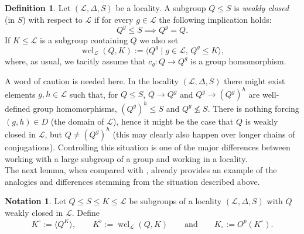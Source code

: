 \documentclass{amsart}
\numberwithin{equation}{section}
\theoremstyle{definition}
\newtheorem{definition}[equation]{Definition}
\newtheorem{notation}[equation]{Notation}
\theoremstyle{subresult}
\theoremstyle{caseresult}
\renewcommand{\L}{\mathcal{L}}
\newcommand{\wcl}{\operatorname{wcl}}
\newcommand{\fto}{\longrightarrow}
\newcommand{\<}{\langle}
\renewcommand{\>}{\rangle}
\begin{document}
\vspace{0.4cm}
\begin{definition}
    Let $(\L,\Delta,S)$ be a locality. A subgroup $Q \le S$ is \emph{weakly closed} (in $S$) with respect to $\L$ if for every $g \in \L$ the following implication holds:
    \[
    Q^g \le S \implies Q^g =Q.
    \]
    If $K \le \L$ is a subgroup containing $Q$ we also set
    \[
        \wcl_\L(Q,K) := \< Q^g \mid g \in \L, \, Q^g \le K \>,
    \]
    where, as usual, we tacitly assume that $c_g: Q \fto Q^g$ is a group homomorphism.
\end{definition}
A word of caution is needed here. In the locality $(\L,\Delta,S)$ there might exist elements $g,h \in \L$ such that, for $Q \le S$, $Q \to Q^g$ and $Q^g \to (Q^g)^h$ are well-defined group homomorphisms, $(Q^g)^h \le S$ and $Q^g \not \le S$. There is nothing forcing $(g,h) \in D$ (the domain of $\L$), hence it might be the case that $Q$ is weakly closed in $\L$, but $Q \ne (Q^g)^h$ (this may clearly also happen over longer chains of conjugations). Controlling this situation is one of the major differences between working with a large subgroup of a group and working in a locality.\\
The next lemma, when compared with \cite[Lemma 1.46]{Meier-Stell-Stroth:2012}, already provides an example of the analogies and differences stemming from the situation described above.

\begin{notation} 
Let $Q \le S \le K \le \L$ be subgroups of a locality $(\L,\Delta,S)$ with $Q$ weakly closed in $\L$. Define
\[
K^\circ := \< Q^K \>, \qquad K^\flat := \wcl_\L(Q,K) \qquad \text{and} \qquad K_\circ := O^p(K^\circ).
\]
\end{notation}
\end{document}

